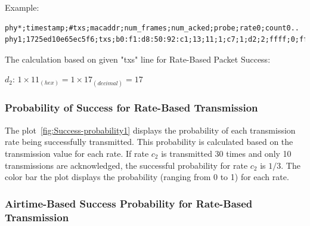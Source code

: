Example:

\begin{lstlisting}[basicstyle=\small]
phy*;timestamp;#txs;macaddr;num_frames;num_acked;probe;rate0;count0..
phy1;1725ed10e65ec5f6;txs;b0:f1:d8:50:92:c1;13;11;1;c7;1;d2;2;ffff;0;ffff;0
\end{lstlisting}


The calculation based on given "txs" line for Rate-Based Packet Success:

$d_2$: $1 \times 11_{(hex)} = 1 \times 17_{(decimal)} = 17$


\subsubsection{Probability of Success for Rate-Based Transmission}
\label{Probability of Success for Rate-Based Transmission}
The plot~\ref{fig:Success-probability1} displays the probability of each transmission rate being successfully transmitted. This probability is calculated based on the transmission value for each rate. If rate $c_2$ is transmitted 30 times and only 10 transmissions are acknowledged, the successful probability for rate $c_2$ is $1/3$. The color bar the plot displays the probability (ranging from 0 to 1) for each rate.

\subsubsection{Airtime-Based Success Probability for Rate-Based Transmission}
\label{sec:Analysis and Optimization:Implementation of an Analysis Tool:airtime-succespb}

